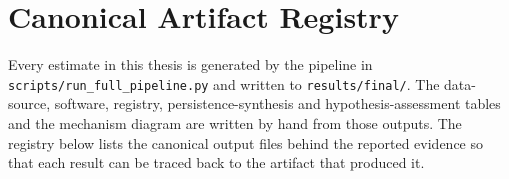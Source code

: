 \section{Canonical Artifact Registry}
\label{app:artifact-registry}

Every estimate in this thesis is generated by the pipeline in
\nolinkurl{scripts/run_full_pipeline.py} and written to \nolinkurl{results/final/}.
The data-source, software, registry, persistence-synthesis and hypothesis-assessment
tables and the mechanism diagram are written by hand from those outputs.
The registry below lists the canonical output files behind the reported evidence so
that each result can be traced back to the artifact that produced it.


